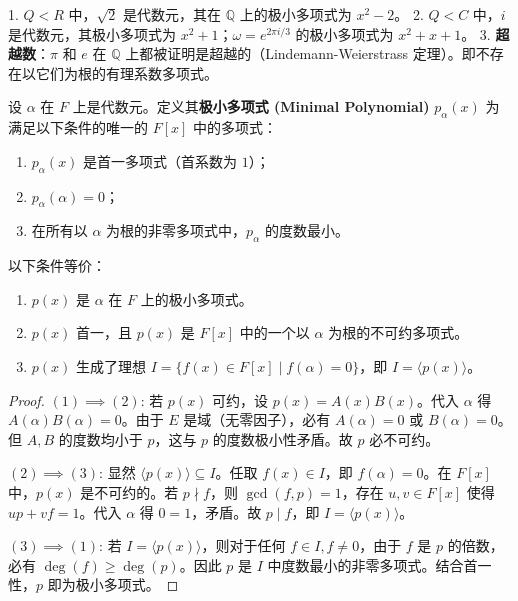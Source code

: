\documentclass[11pt]{article}
\begin{document}
\begin{cnexample}
1. $Q < R$ 中，$\sqrt{2}$ 是代数元，其在 $\mathbb{Q}$ 上的极小多项式为 $x^2 - 2$。
2. $Q < C$ 中，$i$ 是代数元，其极小多项式为 $x^2 + 1$；$\omega = e^{2\pi i / 3}$ 的极小多项式为 $x^2 + x + 1$。
3. \textbf{超越数}：$\pi$ 和 $e$ 在 $\mathbb{Q}$ 上都被证明是超越的（Lindemann-Weierstrass 定理）。即不存在以它们为根的有理系数多项式。
\end{cnexample}

\begin{cndefinition}[极小多项式]
设 $\alpha$ 在 $F$ 上是代数元。定义其\textbf{极小多项式 (Minimal Polynomial)} $p_\alpha(x)$ 为满足以下条件的唯一的 $F[x]$ 中的多项式：
\begin{enumerate}
    \item $p_\alpha(x)$ 是首一多项式（首系数为 $1$）；
    \item $p_\alpha(\alpha) = 0$；
    \item 在所有以 $\alpha$ 为根的非零多项式中，$p_\alpha$ 的度数最小。
\end{enumerate}
\end{cndefinition}

\begin{cnproperty}[极小多项式的等价刻画]
以下条件等价：
\begin{enumerate}
    \item $p(x)$ 是 $\alpha$ 在 $F$ 上的极小多项式。
    \item $p(x)$ 首一，且 $p(x)$ 是 $F[x]$ 中的一个以 $\alpha$ 为根的不可约多项式。
    \item $p(x)$ 生成了理想 $I = \{f(x) \in F[x] \mid f(\alpha) = 0\}$，即 $I = \langle p(x) \rangle$。
\end{enumerate}
\end{cnproperty}
\begin{proof}
$(1) \implies (2)$: 若 $p(x)$ 可约，设 $p(x)=A(x)B(x)$。代入 $\alpha$ 得 $A(\alpha)B(\alpha)=0$。由于 $E$ 是域（无零因子），必有 $A(\alpha)=0$ 或 $B(\alpha)=0$。但 $A, B$ 的度数均小于 $p$，这与 $p$ 的度数极小性矛盾。故 $p$ 必不可约。

$(2) \implies (3)$: 显然 $\langle p(x) \rangle \subseteq I$。任取 $f(x) \in I$，即 $f(\alpha)=0$。在 $F[x]$ 中，$p(x)$ 是不可约的。若 $p \nmid f$，则 $\gcd(f,p)=1$，存在 $u, v \in F[x]$ 使得 $up + vf = 1$。代入 $\alpha$ 得 $0=1$，矛盾。故 $p \mid f$，即 $I = \langle p(x) \rangle$。

$(3) \implies (1)$: 若 $I = \langle p(x) \rangle$，则对于任何 $f \in I, f \neq 0$，由于 $f$ 是 $p$ 的倍数，必有 $\deg(f) \ge \deg(p)$。因此 $p$ 是 $I$ 中度数最小的非零多项式。结合首一性，$p$ 即为极小多项式。
\end{proof}
\end{document}
